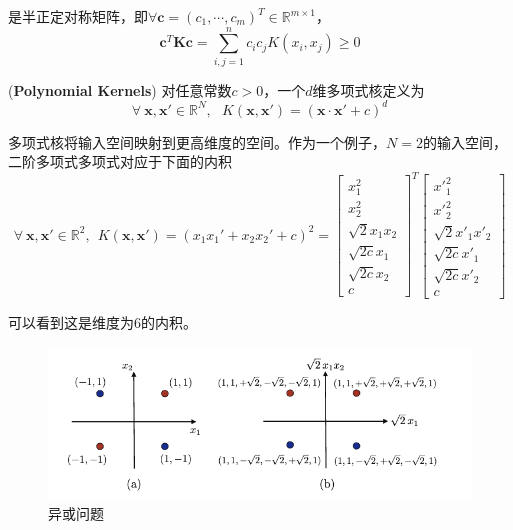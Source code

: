 是半正定对称矩阵，即$\forall \mathbf{c}=(c_1,\cdots,c_m)^T\in \mathbb{R}^{m\times 1}$，
\begin{equation}
    \mathbf{c}^T\mathbf{Kc}=\sum_{i,j=1}^{n}c_ic_jK(x_i,x_j)\geqslant 0
\end{equation}

\begin{example}
    (\textbf{Polynomial Kernels})\hspace*{0.5em} 对任意常数$c>0$，一个$d$维多项式核定义为
    \begin{equation}
        \forall\ \mathbf{x},\mathbf{x}'\in \mathbb{R}^N,\ \ \ K(\mathbf{x},\mathbf{x}')=(\mathbf{x}\cdot \mathbf{x}'+c)^d
    \end{equation}

    多项式核将输入空间映射到更高维度的空间。作为一个例子，$N=2$的输入空间，二阶多项式多项式对应于下面的内积
    \begin{equation}
        \forall\ \mathbf{x},\mathbf{x}'\in \mathbb{R}^2,\ \ K(\mathbf{x},\mathbf{x}')=(x_1x_1'+x_2x_2'+c)^2=
        \left[
            \begin{array}{c}
            x^2_1 \\
            x^2_2 \\
            \sqrt{2}x_1x_2\\
            \sqrt{2c}x_1\\
            \sqrt{2c}x_2\\
            c
        \end{array}\right]^T
        \left[
            \begin{array}{c}
                x'^2_1 \\
                x'^2_2 \\
                \sqrt{2}x'_1x'_2\\
                \sqrt{2c}x'_1\\
                \sqrt{2c}x'_2\\
                c
            \end{array}
        \right]
    \end{equation}

    可以看到这是维度为$6$的内积。
    \begin{figure}[H]
        \centering
        \includegraphics[scale=0.6]{figures/ploynaimal-kernel.png}
        \caption{异或问题}
    \end{figure}

\end{example}

